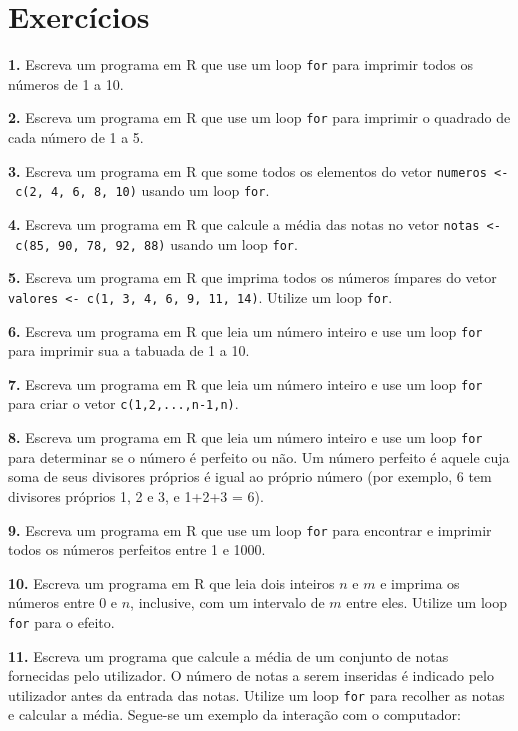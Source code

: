 \documentclass[
]{book}
\begin{document}
\section{Exercícios}\label{exercuxedcios-12}

\textbf{1.} Escreva um programa em R que use um loop \texttt{for} para imprimir
todos os números de 1 a 10.

\textbf{2.} Escreva um programa em R que use um loop \texttt{for} para imprimir o
quadrado de cada número de 1 a 5.

\textbf{3.} Escreva um programa em R que some todos os elementos do vetor
\texttt{numeros\ \textless{}-\ c(2,\ 4,\ 6,\ 8,\ 10)} usando um loop \texttt{for}.

\textbf{4.} Escreva um programa em R que calcule a média das notas no vetor
\texttt{notas\ \textless{}-\ c(85,\ 90,\ 78,\ 92,\ 88)} usando um loop \texttt{for}.

\textbf{5.} Escreva um programa em R que imprima todos os números ímpares do
vetor \texttt{valores\ \textless{}-\ c(1,\ 3,\ 4,\ 6,\ 9,\ 11,\ 14)}. Utilize um loop \texttt{for}.

\textbf{6.} Escreva um programa em R que leia um número inteiro e use um loop
\texttt{for} para imprimir sua a tabuada de 1 a 10.

\textbf{7.} Escreva um programa em R que leia um número inteiro e use um loop \texttt{for} para criar o vetor \texttt{c(1,2,...,n-1,n)}.

\textbf{8.} Escreva um programa em R que leia um número inteiro e use um loop
\texttt{for} para determinar se o número é perfeito ou não. Um número perfeito
é aquele cuja soma de seus divisores próprios é igual ao próprio número
(por exemplo, 6 tem divisores próprios 1, 2 e 3, e 1+2+3 = 6).

\textbf{9.} Escreva um programa em R que use um loop \texttt{for} para encontrar e
imprimir todos os números perfeitos entre 1 e 1000.

\textbf{10.} Escreva um programa em R que leia dois inteiros \(n\) e \(m\) e
imprima os números entre \(0\) e \(n\), inclusive, com um intervalo de \(m\)
entre eles. Utilize um loop \texttt{for} para o efeito.

\textbf{11.} Escreva um programa que calcule a média de um conjunto de notas
fornecidas pelo utilizador. O número de notas a serem inseridas é
indicado pelo utilizador antes da entrada das notas. Utilize um loop
\texttt{for} para recolher as notas e calcular a média. Segue-se um exemplo da
interação com o computador:
\end{document}
